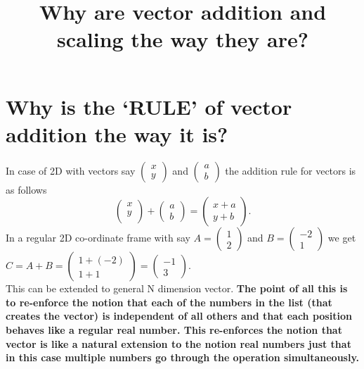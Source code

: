 \documentclass[12pt]{article}
\title{Why are vector addition and scaling the way they are?}
\author{}
\newcommand{\comment}[1]{}
\begin{document}
\maketitle

\section{Why is the `RULE'  of vector addition the way it is?}

In case of 2D with vectors say $ \comment{Column-Vector: x,y} \begin{pmatrix} x \\ y \end{pmatrix} $ and $ \comment{Column-Vector: a,b} \begin{pmatrix} a \\ b \end{pmatrix} $ the addition rule for vectors is as follows
\[
  \begin{pmatrix} x \\ y \\  \end{pmatrix} + \begin{pmatrix} a \\ b \end{pmatrix} = \begin{pmatrix} x+a \\ y+b \end{pmatrix}.
\]
In a regular 2D co-ordinate frame with say $ A = \comment{Column-Vector: 1,2} \begin{pmatrix} 1 \\ 2 \end{pmatrix} $ and $ B = \comment{Column-Vector: -2,1} \begin{pmatrix} -2 \\ 1 \end{pmatrix} $ we get $ C = A + B = \comment{Column-Vector: 1+(-2),1+1} \begin{pmatrix} 1+(-2) \\ 1+1 \end{pmatrix} = \comment{Column-Vector: -1,3} \begin{pmatrix} -1 \\ 3 \end{pmatrix} $.\\

This can be extended to general N dimension vector.
\textbf{The point of all this is to re-enforce the notion that each of the numbers in the list (that creates the vector) is independent of all others and that each position behaves like a regular real number. This re-enforces the notion that vector is like a natural extension to the notion real numbers just that in this case multiple numbers go through the operation simultaneously.} \\
\end{document}

